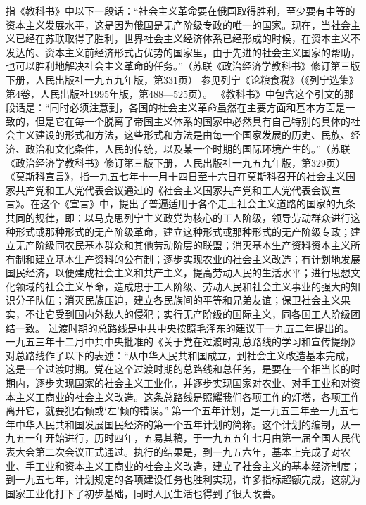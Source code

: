 \begin{maonote}
指《教科书》中以下一段话：“社会主义革命要在俄国取得胜利，至少要有中等的资本主义发展水平，这是因为俄国是无产阶级专政的唯一的国家。现在，当社会主义已经在苏联取得了胜利，世界社会主义经济体系已经形成的时候，在资本主义不发达的、资本主义前经济形式占优势的国家里，由于先进的社会主义国家的帮助，也可以胜利地解决社会主义革命的任务。”（苏联《政治经济学教科书》修订第三版下册，人民出版社一九五九年版，第331页）
参见列宁《论粮食税》（《列宁选集》第4卷，人民出版社1995年版，第488—525页）。
《教科书》中包含这个引文的那段话是：“同时必须注意到，各国的社会主义革命虽然在主要方面和基本方面是一致的，但是它在每一个脱离了帝国主义体系的国家中必然具有自己特别的具体的社会主义建设的形式和方法，这些形式和方法是由每一个国家发展的历史、民族、经济、政治和文化条件，人民的传统，以及某一个时期的国际环境产生的。”（苏联《政治经济学教科书》修订第三版下册，人民出版社一九五九年版，第329页）
《莫斯科宣言》，指一九五七年十一月十四日至十六日在莫斯科召开的社会主义国家共产党和工人党代表会议通过的《社会主义国家共产党和工人党代表会议宣言》。在这个《宣言》中，提出了普遍适用于各个走上社会主义道路的国家的九条共同的规律，即：以马克思列宁主义政党为核心的工人阶级，领导劳动群众进行这种形式或那种形式的无产阶级革命，建立这种形式或那种形式的无产阶级专政；建立无产阶级同农民基本群众和其他劳动阶层的联盟；消灭基本生产资料资本主义所有制和建立基本生产资料的公有制；逐步实现农业的社会主义改造；有计划地发展国民经济，以便建成社会主义和共产主义，提高劳动人民的生活水平；进行思想文化领域的社会主义革命，造成忠于工人阶级、劳动人民和社会主义事业的强大的知识分子队伍；消灭民族压迫，建立各民族间的平等和兄弟友谊；保卫社会主义果实，不让它受到国内外敌人的侵犯；实行无产阶级的国际主义，同各国工人阶级团结一致。
过渡时期的总路线是中共中央按照毛泽东的建议于一九五二年提出的。一九五三年十二月中共中央批准的《关于党在过渡时期总路线的学习和宣传提纲》对总路线作了以下的表述：“从中华人民共和国成立，到社会主义改造基本完成，这是一个过渡时期。党在这个过渡时期的总路线和总任务，是要在一个相当长的时期内，逐步实现国家的社会主义工业化，并逐步实现国家对农业、对手工业和对资本主义工商业的社会主义改造。这条总路线是照耀我们各项工作的灯塔，各项工作离开它，就要犯右倾或‘左’倾的错误。”
第一个五年计划，是一九五三年至一九五七年中华人民共和国发展国民经济的第一个五年计划的简称。这个计划的编制，从一九五一年开始进行，历时四年，五易其稿，于一九五五年七月由第一届全国人民代表大会第二次会议正式通过。执行的结果是，到一九五六年，基本上完成了对农业、手工业和资本主义工商业的社会主义改造，建立了社会主义的基本经济制度；到一九五七年，计划规定的各项建设任务也胜利实现，许多指标超额完成，这就为国家工业化打下了初步基础，同时人民生活也得到了很大改善。

\end{maonote}
